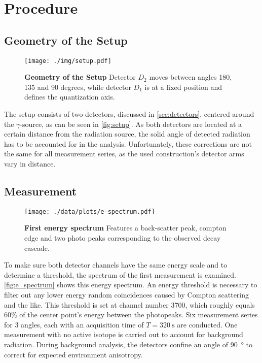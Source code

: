 \chapter{Procedure}

\section{Geometry of the Setup}
\begin{figure}[tbp]
	\centering
	\texttt{[image: ./img/setup.pdf]}
	\caption[Geometry of the Setup]{\textbf{Geometry of the Setup} Detector $D_2$ moves between angles 180, 135 and 90 degrees, while detector $D_1$ is at a fixed position and defines the quantization axis.}
	\label{fig:setup}
\end{figure}
The setup consists of two detectors, discussed in \autoref{sec:detectors}, centered around the $\gamma$-source, as can be seen in \autoref{fig:setup}.
As both detectors are located at a certain distance from the radiation source, the solid angle of detected radiation has to be accounted for in the analysis.
Unfortunately, these corrections are not the same for all measurement series, as the used construction's detector arms vary in distance.

\section{Measurement}
\begin{figure}[tbp]
	\centering
	\texttt{[image: ./data/plots/e-spectrum.pdf]}
	\caption[First energy spectrum]{\textbf{First energy spectrum} Features a back-scatter peak, compton edge and two photo peaks corresponding to the observed decay cascade.}
	\label{fig:e_spectrum}
\end{figure}
To make sure both detector channels have the same energy scale and to determine a threshold, the spectrum of the first measurement is examined.
\autoref{fig:e_spectrum} shows this energy spectrum.
An energy threshold is necessary to filter out any lower energy random coincidences caused by Compton scattering and the like.
This threshold is set at channel number 3700, which roughly equals 60\% of the center point's energy between the photopeaks.
Six measurement series for 3 angles, each with an acquisition time of $T=\SI{320}{\second}$ are conducted.
One measurement with no active isotope is carried out to account for background radiation.
During background analysis, the detectors confine an angle of \SI{90}{\degree} to correct for expected environment anisotropy.
